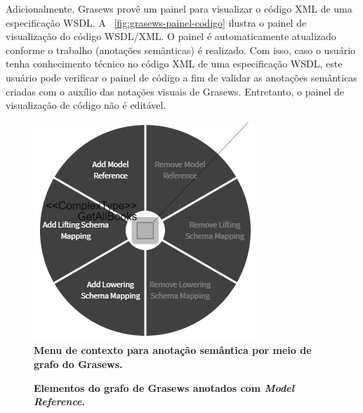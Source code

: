 Adicionalmente, Grasews provê um painel para visualizar o código XML de uma especificação WSDL. A \figurename~\ref{fig:grasews-painel-codigo} ilustra o painel de visualização do código WSDL/XML. O painel é automaticamente atualizado conforme o trabalho (anotações semânticas) é realizado. Com isso, caso o usuário tenha conhecimento técnico no código XML de uma especificação WSDL, este usuário pode verificar o painel de código a fim de validar as anotações semânticas criadas com o auxílio das notações visuais de Grasews. Entretanto, o painel de visualização de código não é editável.

\begin{figure}[h]
        \includegraphics[scale=0.8]{4-grasews/imagens/grasews-grafo-tipo-complexo-contexto.png}
    \centering
    \caption[Menu de contexto para anotação semântica por meio do grafo de Grasews]{\textbf{Menu de contexto para anotação semântica por meio de grafo do Grasews.}}
    \label{fig:grasews-grafo-tipo-complexo-contexto}
\end{figure}

\begin{figure}[h]
    \centering
    \caption[Elementos do grafo de Grasews anotados com \textit{Model Reference}]{\textbf{Elementos do grafo de Grasews anotados com \textit{Model Reference}.}}
    \label{fig:grasews-grafo-model-reference}
\end{figure}

